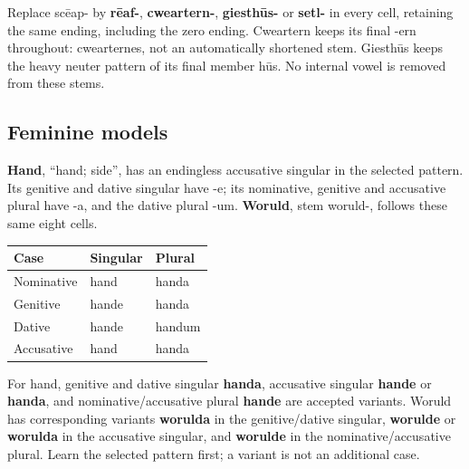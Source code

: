 Replace scēap- by \textbf{rēaf-}, \textbf{cweartern-}, \textbf{giesthūs-} or \textbf{setl-} in every cell, retaining the same ending, including the zero ending. Cweartern keeps its final -ern throughout: cwearternes, not an automatically shortened stem. Giesthūs keeps the heavy neuter pattern of its final member hūs. No internal vowel is removed from these stems.

\subsection*{Feminine models}

\textbf{Hand}, “hand; side”, has an endingless accusative singular in the selected pattern. Its genitive and dative singular have -e; its nominative, genitive and accusative plural have -a, and the dative plural -um. \textbf{Woruld}, stem woruld-, follows these same eight cells.

\par\begingroup
\fontsize{10.5}{13.2}\selectfont
\setlength{\LTleft}{0pt}\setlength{\LTright}{\fill}
\noindent
\begin{tabular}{@{}>{\raggedright\arraybackslash}p{39.46mm}>{\raggedright\arraybackslash}p{39.46mm}>{\raggedright\arraybackslash}p{39.46mm}@{}}
\toprule
\textbf{Case} & \textbf{Singular} & \textbf{Plural} \\
\midrule
Nominative & hand & handa \\
Genitive & hande & handa \\
Dative & hande & handum \\
Accusative & hand & handa \\
\bottomrule
\end{tabular}
\par\endgroup

For hand, genitive and dative singular \textbf{handa}, accusative singular \textbf{hande} or \textbf{handa}, and nominative/\allowbreak{}accusative plural \textbf{hande} are accepted variants. Woruld has corresponding variants \textbf{worulda} in the genitive/\allowbreak{}dative singular, \textbf{worulde} or \textbf{worulda} in the accusative singular, and \textbf{worulde} in the nominative/\allowbreak{}accusative plural. Learn the selected pattern first; a variant is not an additional case.

